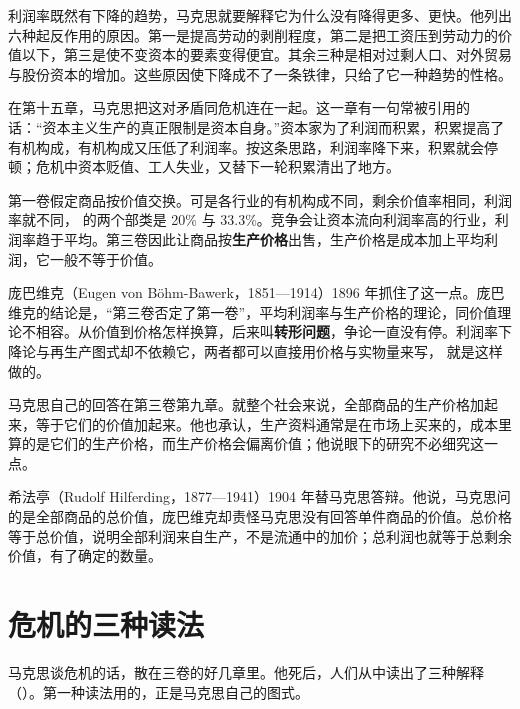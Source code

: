 利润率既然有下降的趋势，马克思就要解释它为什么没有降得更多、更快\cite{marx1894}。他列出六种起反作用的原因。第一是提高劳动的剥削程度，第二是把工资压到劳动力的价值以下，第三是使不变资本的要素变得便宜。其余三种是相对过剩人口、对外贸易与股份资本的增加\cite{marx1894}。这些原因使下降成不了一条铁律，只给了它一种趋势的性格\cite{marx1894}。

在第十五章，马克思把这对矛盾同危机连在一起。这一章有一句常被引用的话：“资本主义生产的真正限制是资本自身。”\cite{marx1894}资本家为了利润而积累，积累提高了有机构成，有机构成又压低了利润率。按这条思路，利润率降下来，积累就会停顿；危机中资本贬值、工人失业，又替下一轮积累清出了地方。

\begin{deeper}
第一卷假定商品按价值交换。可是各行业的有机构成不同，剩余价值率相同，利润率就不同， 的两个部类是 20\% 与 33.3\%。竞争会让资本流向利润率高的行业，利润率趋于平均。第三卷因此让商品按\textbf{生产价格}出售，生产价格是成本加上平均利润，它一般不等于价值。

庞巴维克（Eugen von Böhm-Bawerk，1851—1914）1896 年抓住了这一点。庞巴维克的结论是，“第三卷否定了第一卷”，平均利润率与生产价格的理论，同价值理论不相容\cite{bohm1896}。从价值到价格怎样换算，后来叫\textbf{转形问题}，争论一直没有停。利润率下降论与再生产图式却不依赖它，两者都可以直接用价格与实物量来写， 就是这样做的。

马克思自己的回答在第三卷第九章。就整个社会来说，全部商品的生产价格加起来，等于它们的价值加起来\cite{marx1894}。他也承认，生产资料通常是在市场上买来的，成本里算的是它们的生产价格，而生产价格会偏离价值；他说眼下的研究不必细究这一点\cite{marx1894}。

希法亭（Rudolf Hilferding，1877—1941）1904 年替马克思答辩。他说，马克思问的是全部商品的总价值，庞巴维克却责怪马克思没有回答单件商品的价值\cite{hilferding1904}。总价格等于总价值，说明全部利润来自生产，不是流通中的加价；总利润也就等于总剩余价值，有了确定的数量\cite{hilferding1904}。
\end{deeper}

\section{危机的三种读法}\label{sec:marx-crisis}

马克思谈危机的话，散在三卷的好几章里。他死后，人们从中读出了三种解释（）。第一种读法用的，正是马克思自己的图式。

